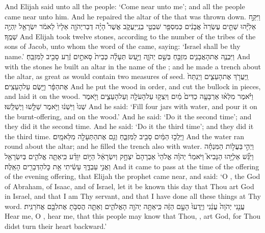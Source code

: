 {And Elijah said unto all the people: ‘Come near unto me’; and all the people came near unto him. And he repaired the altar of the \lord\space that was thrown down.}
{וַיִּקַּ֣ח אֵלִיָּ֗הוּ שְׁתֵּ֤ים עֶשְׂרֵה֙ אֲבָנִ֔ים כְּמִסְפַּ֖ר שִׁבְטֵ֣י בְנֵֽי\maqqaf יַעֲקֹ֑ב אֲשֶׁר֩ הָיָ֨ה דְבַר\maqqaf יְהֹוָ֤ה אֵלָיו֙ לֵאמֹ֔ר יִשְׂרָאֵ֖ל יִֽהְיֶ֥ה שְׁמֶֽךָ׃}
{And Elijah took twelve stones, according to the number of the tribes of the sons of Jacob, unto whom the word of the \lord\space came, saying: ‘Israel shall be thy name.’}
{וַיִּבְנֶ֧ה אֶת\maqqaf הָאֲבָנִ֛ים מִזְבֵּ֖חַ בְּשֵׁ֣ם יְהֹוָ֑ה וַיַּ֣עַשׂ תְּעָלָ֗ה כְּבֵית֙ סָאתַ֣יִם זֶ֔רַע סָבִ֖יב לַמִּזְבֵּֽחַ׃}
{And with the stones he built an altar in the name of the \lord; and he made a trench about the altar, as great as would contain two measures of seed.}
{וַֽיַּעֲרֹ֖ךְ אֶת\maqqaf הָעֵצִ֑ים וַיְנַתַּח֙ אֶת\maqqaf הַפָּ֔ר וַיָּ֖שֶׂם עַל\maqqaf הָעֵצִֽים׃}
{And he put the wood in order, and cut the bullock in pieces, and laid it on the wood.}
{וַיֹּ֗אמֶר מִלְא֨וּ אַרְבָּעָ֤ה כַדִּים֙ מַ֔יִם וְיִֽצְק֥וּ עַל\maqqaf הָעֹלָ֖ה וְעַל\maqqaf הָעֵצִ֑ים וַיֹּ֤אמֶר שְׁנוּ֙ וַיִּשְׁנ֔וּ וַיֹּ֥אמֶר שַׁלֵּ֖שׁוּ וַיְשַׁלֵּֽשׁוּ׃}
{And he said: ‘Fill four jars with water, and pour it on the burnt-offering, and on the wood.’ And he said: ‘Do it the second time’; and they did it the second time. And he said: ‘Do it the third time’; and they did it the third time.}
{וַיֵּֽלְכ֣וּ הַמַּ֔יִם סָבִ֖יב לַמִּזְבֵּ֑חַ וְגַ֥ם אֶת\maqqaf הַתְּעָלָ֖ה מִלֵּא\maqqaf מָֽיִם׃}
{And the water ran round about the altar; and he filled the trench also with water.}
{וַיְהִ֣י \legarmeh  בַּעֲל֣וֹת הַמִּנְחָ֗ה וַיִּגַּ֞שׁ אֵלִיָּ֣הוּ הַנָּבִיא֮ וַיֹּאמַר֒ יְהֹוָ֗ה אֱלֹהֵי֙ אַבְרָהָם֙ יִצְחָ֣ק וְיִשְׂרָאֵ֔ל הַיּ֣וֹם יִוָּדַ֗ע כִּֽי\maqqaf אַתָּ֧ה אֱלֹהִ֛ים בְּיִשְׂרָאֵ֖ל וַאֲנִ֣י עַבְדֶּ֑ךָ  עָשִׂ֔יתִי אֵ֥ת כׇּל\maqqaf הַדְּבָרִ֖ים הָאֵֽלֶּה׃}
{And it came to pass at the time of the offering of the evening offering, that Elijah the prophet came near, and said: ‘O \lord, the God of Abraham, of Isaac, and of Israel, let it be known this day that Thou art God in Israel, and that I am Thy servant, and that I have done all these things at Thy word.}
{עֲנֵ֤נִי יְהֹוָה֙ עֲנֵ֔נִי וְיֵֽדְעוּ֙ הָעָ֣ם הַזֶּ֔ה כִּֽי\maqqaf אַתָּ֥ה יְהֹוָ֖ה הָאֱלֹהִ֑ים וְאַתָּ֛ה הֲסִבֹּ֥תָ אֶת\maqqaf לִבָּ֖ם אֲחֹרַנִּֽית׃}
{Hear me, O \lord, hear me, that this people may know that Thou, \lord, art God, for Thou didst turn their heart backward.’}
